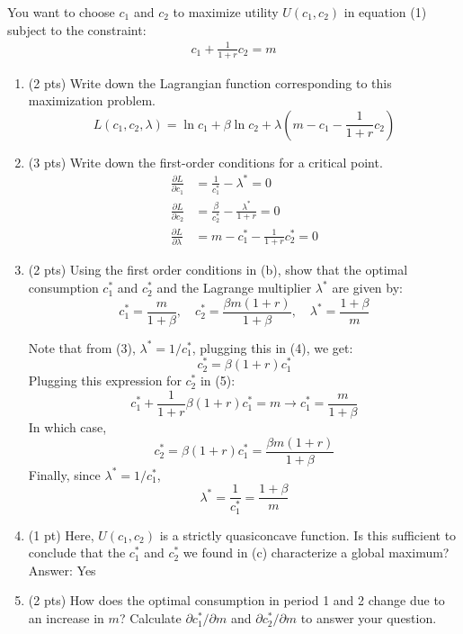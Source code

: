 \documentclass{./../../Latex/tests}
\begin{document}
\begin{enumerate}
\vspace{1em}
You want to choose $c_1$ and $c_2$ to maximize utility $U(c_1, c_2)$ in equation (1) subject to the constraint:
 \begin{align} c_1 + \frac{1}{1+r} c_2 = m \end{align}

\begin{enumerate}
	\item (2 pts) Write down the Lagrangian function corresponding to this maximization problem. 
	$$ L(c_1, c_2, \lambda) = \ln c_1 + \beta \ln c_2 + \lambda\left(m- c_1 - \frac{1}{1+r} c_2 \right) $$
	\item (3 pts) Write down the first-order conditions for a critical point. 
	\begin{align}
		\frac{\partial L}{\partial c_1}&=\frac{1}{c^*_1}-\lambda^*=0 \\
		\frac{\partial L}{\partial c_2}&=\frac{\beta}{c^*_2}-\frac{\lambda^*}{1+r}=0 \\
		\frac{\partial L}{\partial \lambda}&=m- c^*_1 - \frac{1}{1+r} c^*_2=0
	\end{align}
	\item (2 pts) Using the first order conditions in (b), show that the optimal consumption $c_1^*$ and $c_2^*$ and the Lagrange multiplier $\lambda^*$ are given by:
	$$ c_1^* =\frac{m}{1+\beta}, \quad  c_2^* = \frac{\beta m(1+r)}{1+\beta}, \quad \lambda^* = \frac{1+\beta}{m} $$

	Note that from (3), $\lambda^*=1/c_1^*$, plugging this in (4), we get:
	$$ c_2^* = \beta(1+r)c_1^*  $$
	Plugging this expression for $ c_2^*$ in (5):
	$$ c_1^* + \frac{1}{1+r}\beta(1+r)c_1^* = m \rightarrow c_1^* =\frac{m}{1+\beta}  $$
	In which case,
	$$ c_2^* = \beta(1+r)c_1^* = \frac{\beta m(1+r)}{1+\beta}    $$
	Finally, since $\lambda^*=1/c_1^*$,
	$$\lambda^*=\frac{1}{c_1^*} = \frac{1+\beta}{m} $$
	\item (1 pt) Here, $U(c_1, c_2)$ is a strictly quasiconcave function. Is this sufficient to conclude that the $c_1^*$ and $c_2^*$ we found in (c) characterize a global maximum? \\
	Answer: Yes \\
	\item (2 pts) How does the optimal consumption in period 1 and 2 change due to an increase in $m$? Calculate $\partial c_1^*/\partial m$ and $\partial c_2^*/\partial m$ to answer your question. 
	

\end{enumerate}
\end{enumerate}
\end{document}
